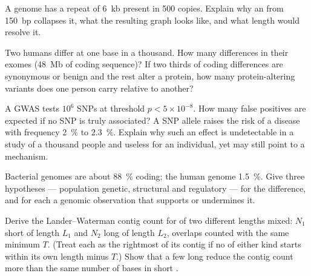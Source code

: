 \begin{exercise}[$\star\star$]\label{exo:b3:genomics:7}
A genome has a repeat of \qty{6}{kb} present in \num{500} copies.
Explain why an  from \qty{150}{bp}  collapses it, what the
resulting graph looks like, and what  length would resolve it.
\end{exercise}

\begin{exercise}[$\star\star$]\label{exo:b3:genomics:8}
Two humans differ at one base in a thousand. How many differences in
their exomes (\qty{48}{Mb} of coding sequence)? If two thirds of coding
differences are synonymous or benign and the rest alter a protein, how
many protein-altering variants does one person carry relative to
another?
\end{exercise}

\begin{exercise}[$\star\star$]\label{exo:b3:genomics:9}
A GWAS tests $10^{6}$ SNPs at threshold $p < 5\times 10^{-8}$. How
many false positives are expected if no SNP is truly associated? A SNP
allele raises the risk of a disease with frequency \qty{2}{\%} to
\qty{2.3}{\%}. Explain why such an effect is undetectable in a study of
a thousand people and useless for an individual, yet may still point
to a mechanism.
\end{exercise}

\begin{exercise}[$\star\star\star$]\label{exo:b3:genomics:10}
Bacterial genomes are about \qty{88}{\%} coding; the human genome
\qty{1.5}{\%}. Give three hypotheses --- population genetic, structural
and regulatory --- for the difference, and for each a genomic
observation that supports or undermines it.
\end{exercise}

\begin{exercise}[$\star\star\star$]\label{exo:b3:genomics:11}
Derive the Lander--Waterman contig count for  of two different
lengths mixed: $N_{1}$ short  of length $L_{1}$ and $N_{2}$ long
 of length $L_{2}$, overlaps counted with the same minimum $T$.
(Treat each  as the rightmost of its contig if no  of either
kind starts within its own length minus $T$.) Show that a few long
 reduce the contig count more than the same number of bases in
short .
\end{exercise}

